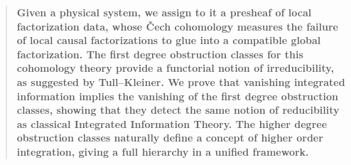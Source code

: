 
\begin{abstract}
\textbf{%
Given a physical system, we assign to it a presheaf of local factorization data, whose \v{C}ech cohomology measures the failure of local causal factorizations to glue into a compatible global factorization. The first degree obstruction classes for this cohomology theory provide a functorial notion of irreducibility, as suggested by Tull--Kleiner. We prove that vanishing integrated information implies the vanishing of the first degree obstruction classes, showing that they detect the same notion of reducibility as classical Integrated Information Theory. The higher degree obstruction classes naturally define a concept of higher order integration, giving a full hierarchy in a unified framework.}
\end{abstract}



